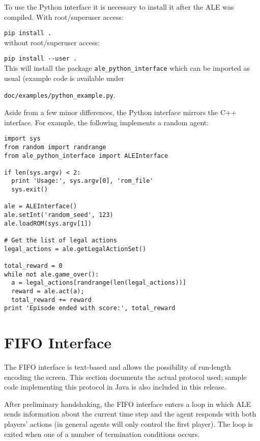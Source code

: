 \documentclass[12pt]{article}
\begin{document}
To use the Python interface it is necessary to install it after the ALE was compiled. With root/superuser access:

\verb+pip install .+\\

without root/superuser access:

\verb+pip install --user .+\\

This will install the package \verb+ale_python_interface+ which can be imported as usual (example code is available under 
\begin{center} \verb+doc/examples/python_example.py+. \end{center}

Aside from a few minor differences, the Python interface mirrors the C++ interface. For example, the following implements a random agent: 

\begin{verbatim}
import sys
from random import randrange
from ale_python_interface import ALEInterface

if len(sys.argv) < 2:
  print 'Usage:', sys.argv[0], 'rom_file'
  sys.exit()

ale = ALEInterface()
ale.setInt('random_seed', 123)
ale.loadROM(sys.argv[1])

# Get the list of legal actions
legal_actions = ale.getLegalActionSet()

total_reward = 0
while not ale.game_over():
  a = legal_actions[randrange(len(legal_actions))]
  reward = ale.act(a);
  total_reward += reward
print 'Episode ended with score:', total_reward
\end{verbatim}

\section{FIFO Interface}\label{sec:pipes_interface}

The FIFO interface is text-based and allows the possibility of run-length encoding the screen. This section documents the actual protocol used; sample code implementing this protocol in Java is also included in this release.

After preliminary handshaking, the FIFO interface enters a loop in which ALE sends information about the current time step and the agent responds with both players' actions (in general agents will only control the first player). The loop is exited when one of a number of termination conditions occurs.
\end{document}
